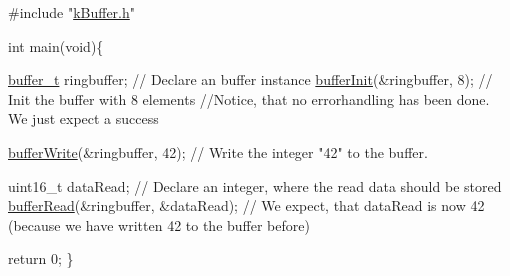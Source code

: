 \begin{DoxyCode}
\textcolor{preprocessor}{#include "\hyperlink{k_buffer_8h}{kBuffer.h}"}

\textcolor{keywordtype}{int} main(\textcolor{keywordtype}{void})\{

 \hyperlink{structbuffer__t}{buffer\_t} ringbuffer;                \textcolor{comment}{// Declare an buffer instance}
 \hyperlink{k_buffer_8c_aec18d6ea571b1326dbeb7ca15f4969c0}{bufferInit}(&ringbuffer, 8);         \textcolor{comment}{// Init the buffer with 8 elements}
 \textcolor{comment}{//Notice, that no errorhandling has been done. We just expect a success}
 
 \hyperlink{k_buffer_8c_a9d6410a89adf65a3ef12340ecb9bbd55}{bufferWrite}(&ringbuffer, 42);       \textcolor{comment}{// Write the integer "42" to the buffer.}

 uint16\_t dataRead;                  \textcolor{comment}{// Declare an integer, where the read data should be stored}
 \hyperlink{k_buffer_8c_a9b80be9033ccd6b5a101f811520ab4cc}{bufferRead}(&ringbuffer, &dataRead); \textcolor{comment}{// We expect, that dataRead is now 42 (because we have
       written 42 to the buffer before)}

 \textcolor{keywordflow}{return} 0;
\}
\end{DoxyCode}
 